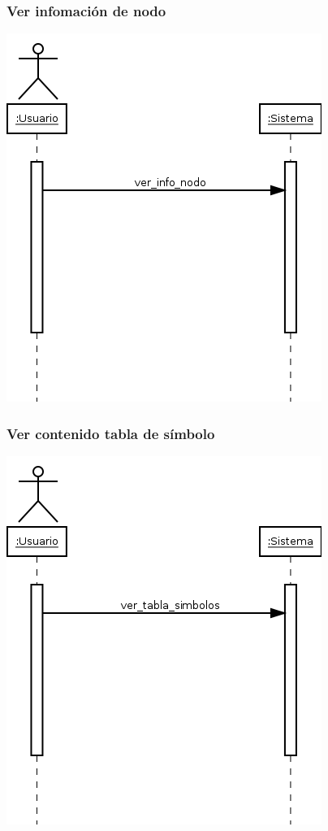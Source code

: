 \subsubsection{Ver infomación de nodo}
\begin{center}
\includegraphics[scale=0.4]{ver_info_nodo.png} \\
\end{center}
\subsubsection{Ver contenido tabla de símbolo}
\begin{center}
\includegraphics[scale=0.4]{ver_tabla_simbolos.png} \\
\end{center}
